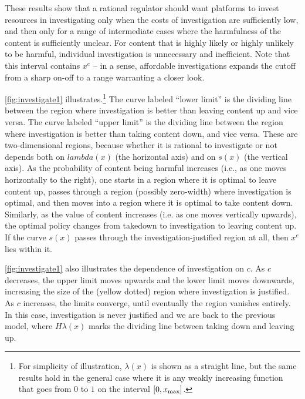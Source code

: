 These results show that a rational regulator should want platforms to invest resources in investigating only when the costs of investigation are sufficiently low, and then only for a range of intermediate cases where the harmfulness of the content is sufficiently unclear. For content that is highly likely or highly unlikely to be harmful, individual investigation is unnecessary and inefficient. Note that this interval contains $x^e$ -- in a sense, affordable investigations expands the cutoff from a sharp on-off to a range warranting a closer look.

\autoref{fig:investigate1} illustrates.\footnote{For simplicity of illustration, $\lambda(x)$ is shown as a straight line, but the same results hold in the general case where it is any weakly increasing function that goes from $0$ to $1$ on the interval $[0,x_{\text{max}}]$.} The curve labeled ``lower limit'' is the dividing line between the region where investigation is better than leaving content up and vice versa. The curve labeled ``upper limit'' is the dividing line between the region where investigation is better than taking content down, and vice versa. These are two-dimensional regions, because whether it is rational to investigate or not depends both on $lambda(x)$ (the horizontal axis) and on $s(x)$ (the vertical axis). As the probability of content being harmful increases (i.e., as one moves horizontally to the right), one starts in a region where it is optimal to leave content up, passes through a region (possibly zero-width) where investigation is optimal, and then moves into a region where it is optimal to take content down. Similarly, as the value of content increases (i.e. as one moves vertically upwards), the optimal policy changes from takedown to investigation to leaving content up. If the curve $s(x)$ passes through the investigation-justified region at all, then $x^e$ lies within it.

\autoref{fig:investigate1} also illustrates the dependence of investigation on $c$. As $c$ decreases, the upper limit moves upwards and the lower limit moves downwards, increasing the size of the (yellow dotted) region where investigation is justified. As $c$ increases, the limits converge, until eventually the region vanishes entirely. In this case, investigation is never justified and we are back to the previous model, where $H\lambda(x)$ marks the dividing line between taking down and leaving up.

